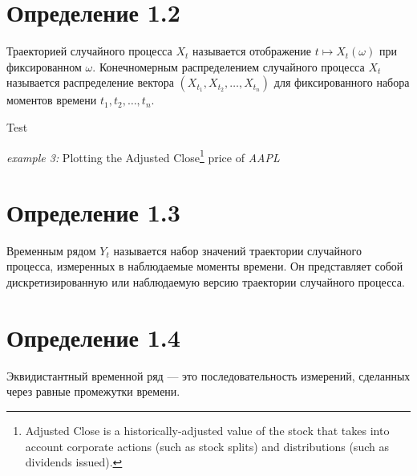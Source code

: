 \section*{Определение 1.2}
Траекторией случайного процесса \( X_t \)
называется отображение \( t \mapsto X_t(\omega) \) при
фиксированном \( \omega \).
Конечномерным распределением случайного процесса \( X_t \)
называется распределение вектора \( (X_{t_1}, X_{t_2}, \ldots,
X_{t_n}) \) для фиксированного набора моментов
времени \( t_1, t_2, \ldots, t_n \).


 {Test}




\noindent
\begin{minipage}{\linewidth}
  \noindent\textit{example 3:} Plotting the Adjusted
  Close\footnote{Adjusted Close is a historically-adjusted value of
    the stock that takes into account corporate actions (such as stock
  splits) and distributions (such as dividends issued).} price of \textit{AAPL}
  
\end{minipage}

\section*{Определение 1.3} Временным рядом \( Y_t \) называется
набор значений траектории случайного процесса,
измеренных в наблюдаемые моменты времени. Он представляет собой
дискретизированную или наблюдаемую версию траектории случайного процесса.

\section*{Определение 1.4}
Эквидистантный временной ряд — это последовательность измерений,
сделанных через равные промежутки времени.

